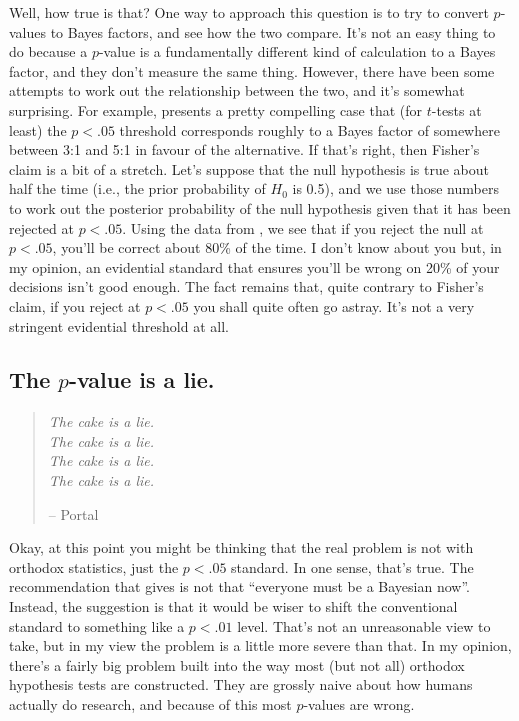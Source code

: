 Well, how true is that? One way to approach this question is to try to convert $p$-values to Bayes factors, and see how the two compare. It's not an easy thing to do because a $p$-value is a fundamentally different kind of calculation to a Bayes factor, and they don't measure the same thing. However, there have been some attempts to work out the relationship between the two, and it's somewhat surprising. For example, \textcite{Johnson2013} presents a pretty compelling case that (for $t$-tests at least) the  $p<.05$ threshold corresponds roughly to a Bayes factor of somewhere between 3:1 and 5:1 in favour of the alternative. If that's right, then Fisher's claim is a bit of a stretch. Let's suppose that the null hypothesis is true about half the time (i.e., the prior probability of $H_0$ is 0.5), and we use those numbers to work out the posterior probability of the null hypothesis given that it has been rejected at $p<.05$. Using the data from \textcite{Johnson2013}, we see that if you reject the null at $p<.05$, you'll be correct about 80\% of the time. I don't know about you but, in my opinion, an evidential standard that ensures you'll be wrong on 20\% of your decisions isn't good enough. The fact remains that, quite contrary to Fisher's claim, if you reject at $p<.05$ you shall quite often go astray. It's not a very stringent evidential threshold at all. 

\subsection{The $p$-value is a lie.}

\begin{quote}
{\it The cake is a lie.} \\ 
{\it The cake is a lie.} \\ 
{\it The cake is a lie.} \\ 
{\it The cake is a lie.} 
 
\hspace*{1cm} -- Portal
\end{quote}

Okay, at this point you might be thinking that the real problem is not with orthodox statistics, just the $p<.05$ standard. In one sense, that's true. The recommendation that \textcite{Johnson2013} gives is not that ``everyone must be a Bayesian now''. Instead, the suggestion is that it would be wiser to shift the conventional standard to something like a $p<.01$ level. That's not an unreasonable view to take, but in my view the problem is a little more severe than that. In my opinion, there's a fairly big problem built into the way most (but not all) orthodox hypothesis tests are constructed. They are grossly naive about how humans actually do research, and because of this most $p$-values are wrong. 

